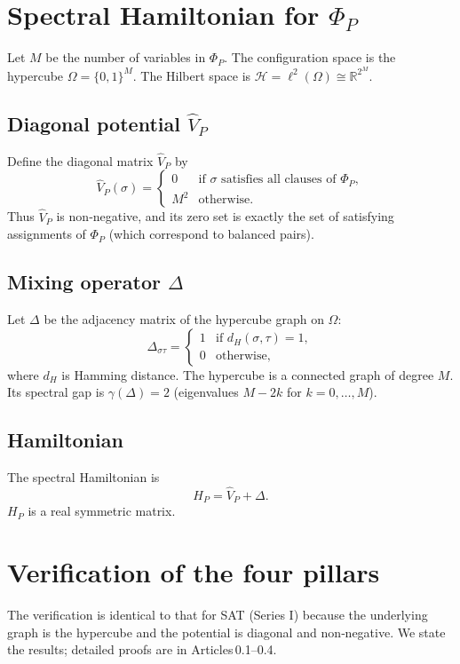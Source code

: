\documentclass[11pt,a4paper]{article}
\begin{document}
\section{Spectral Hamiltonian for $\Phi_P$}

Let $M$ be the number of variables in $\Phi_P$. The configuration space is the hypercube $\Omega = \{0,1\}^M$. The Hilbert space is $\mathcal{H} = \ell^2(\Omega) \cong \mathbb{R}^{2^M}$.

\subsection{Diagonal potential $\hat{V}_P$}
Define the diagonal matrix $\hat{V}_P$ by
\[
\hat{V}_P(\sigma) = \begin{cases}
0 & \text{if }\sigma\text{ satisfies all clauses of } \Phi_P,\\
M^2 & \text{otherwise}.
\end{cases}
\]
Thus $\hat{V}_P$ is non‑negative, and its zero set is exactly the set of satisfying assignments of $\Phi_P$ (which correspond to balanced pairs).

\subsection{Mixing operator $\Delta$}
Let $\Delta$ be the adjacency matrix of the hypercube graph on $\Omega$:
\[
\Delta_{\sigma\tau} = \begin{cases}
1 & \text{if } d_H(\sigma,\tau)=1,\\
0 & \text{otherwise},
\end{cases}
\]
where $d_H$ is Hamming distance. The hypercube is a connected graph of degree $M$. Its spectral gap is $\gamma(\Delta)=2$ (eigenvalues $M-2k$ for $k=0,\dots,M$).

\subsection{Hamiltonian}
The spectral Hamiltonian is
\[
H_P = \hat{V}_P + \Delta.
\]
$H_P$ is a real symmetric matrix.

\section{Verification of the four pillars}

The verification is identical to that for SAT (Series I) because the underlying graph is the hypercube and the potential is diagonal and non‑negative. We state the results; detailed proofs are in Articles 0.1–0.4.
\end{document}

